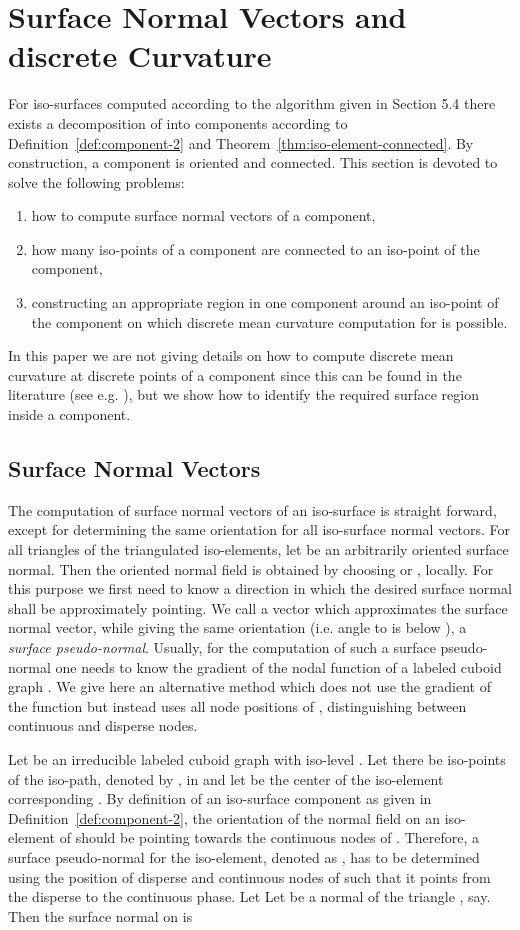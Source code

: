 \documentclass[a4paper,11pt]{article}
\begin{document}
\section{Surface Normal Vectors and discrete Curvature}
For iso-surfaces  computed according to the algorithm given in Section 5.4 there exists
a decomposition of  into components according to Definition~\ref{def:component-2} and
Theorem~\ref{thm:iso-element-connected}. By construction, a component is oriented and connected.
This section is devoted to solve the following problems:
\begin{enumerate}
\item how to compute surface normal vectors of a component,
\item how many iso-points of a component are connected to an iso-point  of the component,
\item constructing an appropriate region in one component around an iso-point  of the component
on which discrete mean curvature computation for  is possible.
\end{enumerate}
In this paper we are not giving details on how to compute discrete mean curvature at discrete points of
a component since this can be found in the literature (see e.g. \cite{Meyer02Vismath}), but we
show how to identify the required surface region inside a component.

\subsection{Surface Normal Vectors}
The computation of surface normal vectors of an iso-surface is straight forward, except for
determining the same orientation for all iso-surface normal vectors. For all triangles of the triangulated
iso-elements, let  be an arbitrarily oriented surface normal. Then the oriented normal field
 is obtained by choosing  or , locally. For this purpose we first
need to know a direction in which the desired surface normal shall be approximately pointing. We call
a vector which approximates the surface normal vector, while giving the same orientation (i.e. angle to
 is below ), a {\it surface pseudo-normal}. Usually, for the computation of such a
surface pseudo-normal one needs to know the gradient of the nodal function  of a labeled
cuboid graph . We give here an alternative method which does not use the gradient
of the function  but instead uses all node positions of , distinguishing between continuous
and disperse nodes.

Let  be an irreducible labeled cuboid graph with iso-level . Let there be
 iso-points  of the iso-path, denoted by , in  and let  be the
center of the iso-element  corresponding . By definition of an iso-surface
component as given in Definition~\ref{def:component-2}, the orientation of the normal field on an
iso-element of  should be pointing towards the continuous nodes of . Therefore, a surface pseudo-normal
for the iso-element, denoted as , has to be determined using the position of
disperse and continuous nodes of  such that it points from the disperse to the continuous phase. Let
Let  be a normal of the triangle , say. Then the surface normal  on
 is
\end{document}
